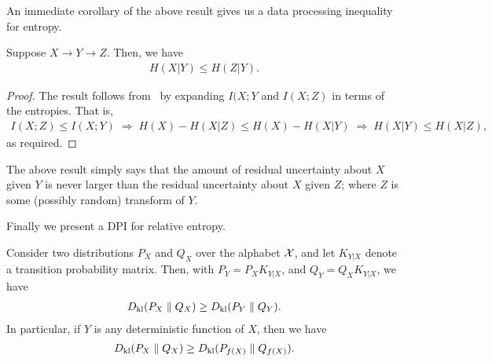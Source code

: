                 An immediate corollary of the above result gives us a data processing inequality for entropy. 
                \begin{corollary}
                    Suppose $X \rightarrow Y \rightarrow Z$. Then, we have 
                    \begin{align}
                        H(X|Y) \leq H(Z|Y). 
                    \end{align}
                \end{corollary}
                \begin{proof}
                    The result follows from~ by expanding $I(X;Y$ and $I(X;Z)$ in terms of the entropies. That is, 
                    \begin{align}
                    I(X; Z) \leq I(X; Y) \; \Rightarrow \; H(X) - H(X|Z) \leq H(X) - H(X|Y)\; \Rightarrow \; H(X|Y) \leq H(X|Z), 
                    \end{align}
                    as required. 
                \end{proof}
                The above result simply says that the amount of residual uncertainty about $X$ given $Y$ is never larger than the residual uncertainty about $X$ given $Z$; where $Z$ is some (possibly random) transform of $Y$. 

                Finally we present a DPI for relative entropy.                 
                \begin{theorem}
                    \label{thm:dpi-relative-entropy} Consider two distributions $P_X$ and $Q_X$ over the alphabet $\mathcal{X}$, and let $K_{Y|X}$ denote a transition probability matrix. Then, with $P_Y = P_XK_{Y|X}$, and $Q_Y = Q_X K_{Y|X}$, we have 
                    \begin{align}
                        D_{\text{kl}}(P_X \parallel Q_X) \geq D_{\text{kl}}(P_Y \parallel Q_Y). 
                    \end{align}
                    In particular, if $Y$ is any deterministic function of $X$, then we have 
                    \begin{align}
                        D_{\text{kl}}(P_X \parallel Q_X) \geq D_{\text{kl}}(P_{f(X)} \parallel Q_{f(X)} ). 
                    \end{align}
                \end{theorem}

